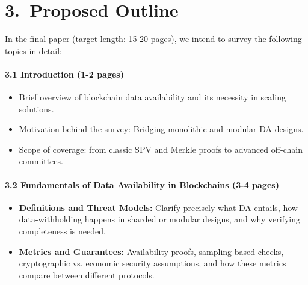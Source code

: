 \documentclass[12pt]{article}
\begin{document}
\section*{3.\ Proposed Outline}

\noindent
In the final paper (target length: 15-20 pages), we intend to survey the following 
topics in detail:

\paragraph{3.1 Introduction (1-2 pages)}
\begin{itemize}
    \item Brief overview of blockchain data availability and its necessity in 
    scaling solutions.
    \item Motivation behind the survey: Bridging monolithic and modular DA designs.
    \item Scope of coverage: from classic SPV and Merkle proofs to advanced off-chain 
    committees.
\end{itemize}

\paragraph{3.2 Fundamentals of Data Availability in Blockchains (3-4 pages)}
\begin{itemize}
    \item \textbf{Definitions and Threat Models:} Clarify precisely what DA entails, how data-withholding happens in sharded or modular designs, and why verifying completeness is needed. 
    \item \textbf{Metrics and Guarantees:} Availability proofs, sampling based checks, cryptographic vs. economic security assumptions, and how these metrics compare between different protocols.
\end{itemize}
\end{document}
